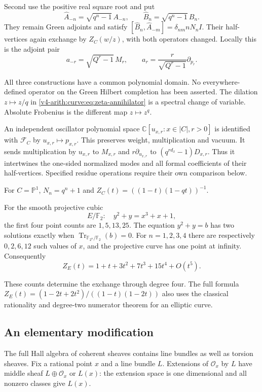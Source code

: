Second use the positive real square root and put
\[
 \widehat A_{-n}=\sqrt{q^n-1}\,A_{-n},\qquad
 \widehat B_n=\sqrt{q^n-1}\,B_n.
\]
They remain Green adjoints and satisfy
$[\widehat B_n,\widehat A_{-m}]=\delta_{nm}nN_nI$.
Their half-vertices again exchange by $Z_C(w/z)$, with both
operators changed. Locally this is the adjoint pair
\[
 a_{-r}=\sqrt{Q^r-1}\,M_r,\qquad
 a_r=\frac r{\sqrt{Q^r-1}}\partial_{p_r}.
\]

All three constructions have a common polynomial domain.
No everywhere-defined operator on the Green Hilbert completion has
been asserted. The dilation $z\mapsto z/q$ in
\eqref{v4-arith:curve:eq:zeta-annihilator} is a spectral change of
variable. Absolute Frobenius is the different map $z\mapsto z^q$.

An independent oscillator polynomial space
$\mathbb C[u_{x,r}:x\in|C|,r>0]$ is identified with $\mathcal F_C$
by $u_{x,r}\mapsto p_{x,r}$. This preserves weight, multiplication
and vacuum. It sends multiplication by $u_{x,r}$ to $M_{x,r}$
and $r\partial_{u_{x,r}}$ to $(q^{rd_x}-1)D_{x,r}$.
Thus it intertwines the one-sided normalized modes and all formal
coefficients of their half-vertices. Specified residue operations
require their own comparison below.

\begin{example}\label{v4-arith:curve:ex:curves}
For $C=\mathbb P^1$, $N_n=q^n+1$ and
$Z_C(t)=((1-t)(1-qt))^{-1}$.

For the smooth projective cubic
\[
 E/\mathbb F_2:\quad y^2+y=x^3+x+1,
\]
the first four point counts are $1,5,13,25$.
The equation $y^2+y=b$ has two solutions exactly when
$\operatorname{Tr}_{\mathbb F_{2^n}/\mathbb F_2}(b)=0$.
For $n=1,2,3,4$ there are respectively $0,2,6,12$ such values of
$x$, and the projective curve has one point at infinity. Consequently
\[
 Z_E(t)=1+t+3t^2+7t^3+15t^4+O(t^5).
\]

These counts determine the exchange through degree four. The full
formula
$Z_E(t)=(1-2t+2t^2)/((1-t)(1-2t))$
also uses the classical rationality and degree-two numerator theorem
for an elliptic curve.
\end{example}

\subsection{An elementary modification}

The full Hall algebra of coherent sheaves contains line bundles as
well as torsion sheaves. Fix a rational point $x$ and a line bundle
$L$. Extensions of $\mathcal O_x$ by $L$ have middle sheaf
$L\oplus\mathcal O_x$ or $L(x)$: the extension space is one
dimensional and all nonzero classes give $L(x)$.

